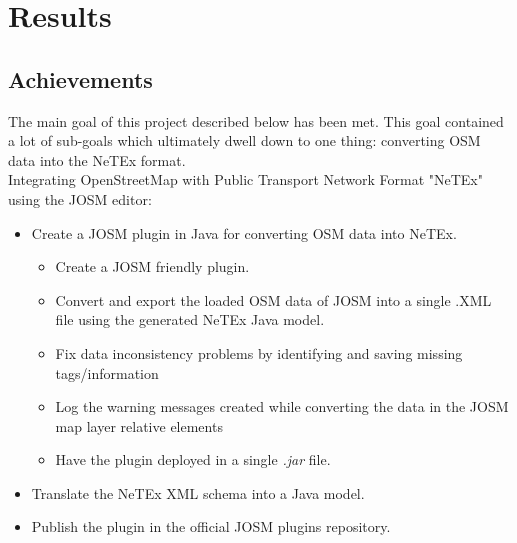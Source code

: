 \chapter{Results}
\section{Achievements}
The main goal of this project described below has been met. This goal contained a lot of sub-goals which ultimately dwell down to one thing: converting OSM data into the NeTEx format.\\
\newline
Integrating OpenStreetMap with Public Transport Network Format "NeTEx" using the JOSM editor:
\begin{itemize}
	\item{Create a JOSM plugin in Java for converting OSM data into NeTEx.}
	\begin{itemize}
		\item{Create a JOSM friendly plugin.}
		\item{Convert and export the loaded OSM data of JOSM into a single .XML file using the generated NeTEx Java model.}
		\item{Fix data inconsistency problems by identifying and saving missing tags/information}
		\item{Log the warning messages created while converting the data in the JOSM map layer relative elements}
		\item{Have the plugin deployed in a single \textit{.jar} file.}
	\end{itemize}
	\item{Translate the NeTEx XML schema into a Java model.}
	\item{Publish the plugin in the official JOSM plugins repository.}
\end{itemize}
\newpage
